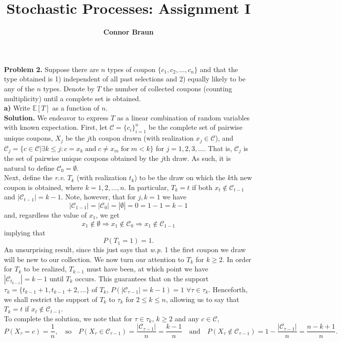 \documentclass[11pt, letterpaper]{article}
\title{\bf Stochastic Processes: Assignment I}
\author{\bf Connor Braun}
\date{}
\newcommand{\mbb}[1]{\mathbb{#1}}
\begin{document}
    \maketitle
    {\noindent \bf Problem 2.} Suppose there are $n$ types of coupon $\{c_1,c_2,\dots,c_n\}$ and that the type obtained is 1) independent of all past selections and 2) equally likely to be any of the $n$ types.
    Denote by $T$ the number of collected coupons (counting multiplicity) until a complete set is obtained.\\[10pt]
    {\bf a)} Write $\mbb{E}[T]$ as a function of $n$.\\[10pt]
    {\bf Solution.} We endeavor to express $T$ as a linear combination of random variables with known expectation. First, let $\mathcal{C}=\{c_i\}_{i=1}^n$ be the complete set of pairwise unique coupons, $X_j$ be the $j$th coupon drawn (with realization $x_j\in\mathcal{C}$),
    and $\mathcal{C}_j=\{c\in\mathcal{C}|\exists k\leq j:c=x_k\;\text{and}\;c\neq x_m\;\text{for}\;m<k\}$ for $j=1,2,3,\dots$. That is, $\mathcal{C}_j$ is the set of pairwise unique coupons obtained by the $j$th draw. As such, it is natural to define $\mathcal{C}_0=\emptyset$.\\[10pt]
    Next, define the {\it r.v.} $T_k$ (with realization $t_k$) to be the draw on which the $k$th new coupon is obtained, where $k=1,2,\dots,n$. In particular, $T_k=t$ if both $x_t\notin \mathcal{C}_{t-1}$ and $|\mathcal{C}_{t-1}|=k-1$. Note, however, that for $j,k=1$ we have
    \[|\mathcal{C}_{1-1}|=|\mathcal{C}_0|=|\emptyset|=0=1-1=k-1\]
    and, regardless the value of $x_1$, we get
    \[x_1\notin\emptyset\Rightarrow x_1\notin\mathcal{C}_0\Rightarrow x_1\notin\mathcal{C}_{1-1}\]
    implying that
    \[P(T_1=1)=1.\]
    An unsurprising result, since this just says that {\it w.p.} 1 the first coupon we draw will be new to our collection. We now turn our attention to $T_k$ for $k\geq 2$.
    In order for $T_k$ to be realized, $T_{k-1}$ must have been, at which point we have $|\mathcal{C}_{t_{k-1}}|=k-1$ until $T_k$ occurs.
    This guarantees that on the support $\tau_k=\{t_{k-1}+1,t_{k-1}+2,\dots\}$ of $T_k$, $P(|\mathcal{C}_{\tau-1}|=k-1)=1$ $\forall\tau\in\tau_k$. Henceforth, we shall restrict the support of $T_k$ to $\tau_k$ for $2\leq k\leq n$,
    allowing us to say that $T_k=t$ if $x_t\notin\mathcal{C}_{t-1}$.\\[10pt]
    To complete the solution, we note that for $\tau\in\tau_k$, $k\geq 2$ and any $c\in\mathcal{C}$,
    \[P(X_{\tau}=c)=\frac{1}{n},\quad\text{so}\quad P(X_\tau\in\mathcal{C}_{\tau-1})=\frac{|\mathcal{C}_{\tau-1}|}{n}=\frac{k-1}{n}\quad\text{and}\quad P(X_\tau\notin \mathcal{C}_{\tau-1})=1-\frac{|\mathcal{C}_{\tau-1}|}{n}=\frac{n-k+1}{n}.\]
\end{document}
